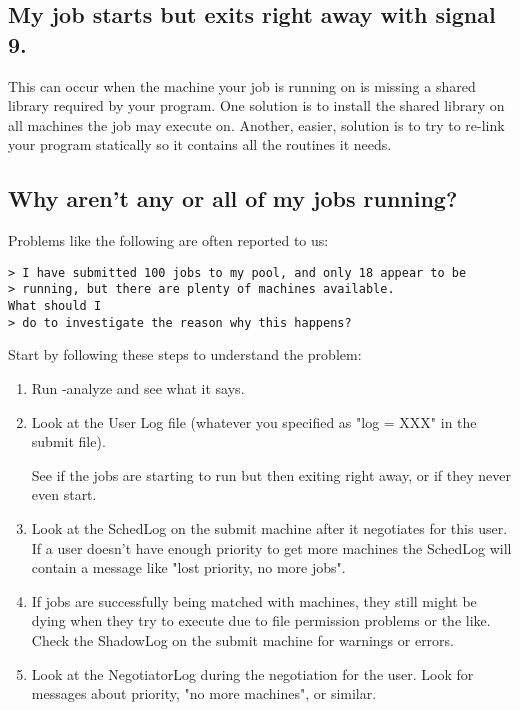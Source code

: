 \subsection{My job starts but exits right away with signal 9.}


This can occur when the machine your job is running on is missing a
shared library required by your program.
One solution is to install the shared library on all machines the job
may execute on.
Another, easier, solution is to try to re-link your program statically
so it contains all the routines it needs.


\subsection{Why aren't any or all of my jobs running?}

Problems like the following are often reported to us:

\begin{verbatim}
> I have submitted 100 jobs to my pool, and only 18 appear to be
> running, but there are plenty of machines available.
What should I
> do to investigate the reason why this happens?
\end{verbatim}

Start by following these steps to understand the problem:

\begin{enumerate}

\item Run  -analyze and see what it says.

\item Look at the User Log file (whatever you specified as "log = XXX"
in the submit file).

See if the jobs are starting to run but then exiting right away, or if
they never even start.

\item Look at the SchedLog on the submit machine after it negotiates
for this user.
If a user doesn't have enough priority to get more machines the
SchedLog will contain a message like "lost priority, no more jobs".

\item If jobs are successfully being matched with machines, they
still might be dying when they try to execute due to file permission
problems or the like.
Check the ShadowLog on the submit machine for warnings or errors.

\item Look at the NegotiatorLog during the negotiation for the user.
Look for messages about priority, "no more machines", or similar.

\end{enumerate}

